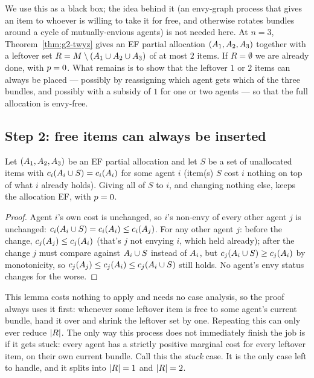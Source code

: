 We use this as a black box; the idea behind it (an envy-graph process that
gives an item to whoever is willing to take it for free, and otherwise
rotates bundles around a cycle of mutually-envious agents) is not needed
here. At $n=3$, Theorem~\ref{thm:g2-twyz} gives an EF partial allocation
$(A_{1},A_{2},A_{3})$ together with a leftover set $R = M
\setminus (A_{1} \cup A_{2} \cup A_{3})$ of at most $2$ items. If
$R = \emptyset$ we are already done, with $p = 0$. What remains is
to show that the leftover $1$ or $2$ items can always be placed --- possibly
by reassigning which agent gets which of the three bundles, and possibly
with a subsidy of $1$ for one or two agents --- so that the full allocation
is envy-free.

\subsection{Step 2: free items can always be inserted}
\label{sec:g2-step2}

\begin{lemma}
\label{lem:g2-free}
Let $(A_{1},A_{2},A_{3})$ be an EF partial allocation and let $S$ be
a set of unallocated items with $c_i(A_{i} \cup S) = c_i(A_{i})$ for some agent $i$ (item(s) $S$ cost $i$ nothing on top of what $i$
already holds). Giving all of $S$ to $i$, and changing nothing else, keeps
the allocation EF, with $p = 0$.
\end{lemma}
\begin{proof}
Agent $i$'s own cost is unchanged, so $i$'s non-envy of every other agent
$j$ is unchanged: $c_i(A_{i} \cup S) = c_i(A_{i}) \le
c_i(A_{j})$. For any other agent $j$: before the change,
$c_j(A_{j}) \le c_j(A_{i})$ (that's $j$ not envying $i$,
which held already); after the change $j$ must compare against $A_{i}
\cup S$ instead of $A_{i}$, but $c_j(A_{i} \cup S) \ge
c_j(A_{i})$ by monotonicity, so $c_j(A_{j}) \le c_j(A_{i}) \le c_j(A_{i} \cup S)$ still holds. No agent's envy status
changes for the worse.
\end{proof}

This lemma costs nothing to apply and needs no case analysis, so the proof
always uses it first: whenever some leftover item is free to some agent's
current bundle, hand it over and shrink the leftover set by one. Repeating
this can only ever reduce $\left\lvert R\right\rvert$. The only way this process does not
immediately finish the job is if it gets stuck: every agent has a strictly
positive marginal cost for every leftover item, on their own current bundle.
Call this the \emph{stuck} case. It is the only case left to handle, and it
splits into $\left\lvert R\right\rvert = 1$ and $\left\lvert R\right\rvert = 2$.

